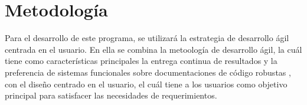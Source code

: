\section{Metodología}

Para el desarrollo de este programa, se utilizará la estrategia de desarrollo ágil centrada en el usuario. En ella se combina la metoología de desarrollo ágil, la cuál tiene como características principales la entrega continua de resultados y la preferencia de sistemas funcionales sobre documentaciones de código robustas \cite{fowler2001agile}, con el diseño centrado en el usuario, el cuál tiene a los usuarios como objetivo principal para satisfacer las necesidades de requerimientos.

\cite{hussain_agile_usercentered}
